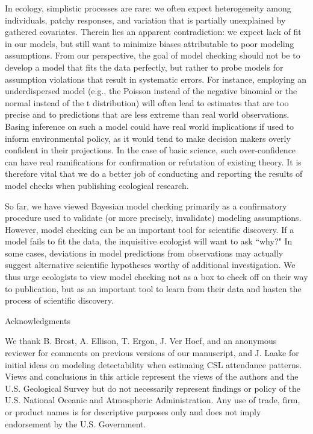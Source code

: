 \documentclass[12pt,english]{article}
\begin{document}
\begin{spacing}{1.9}
In ecology, simplistic processes are rare: we often expect
heterogeneity among individuals, patchy responses, and variation that
is partially unexplained by gathered covariates.  Therein lies an
apparent contradiction: we expect lack of fit in our models, but still
want to minimize biases attributable to poor modeling assumptions.
From our perspective, the goal of model checking should not be to
develop a model that fits the data perfectly, but rather to probe
models for assumption violations that result in systematic errors.  For instance,
employing an underdispersed model (e.g., the Poisson instead of the negative
binomial or the normal instead of the t distribution) will often lead to estimates that
are too precise and to predictions that are less extreme than real world observations.
Basing inference on such a model could have real world implications if used
to inform environmental policy, as it would tend to make decision makers overly confident
in their projections.  In the case of basic science, such over-confidence can have
real ramifications for confirmation or refutation of existing theory. It is therefore vital that we do a better job
of conducting and reporting the results of model checks when
publishing ecological research.

So far, we have viewed Bayesian model checking primarily as a confirmatory procedure used to
validate (or more precisely, invalidate) modeling assumptions.  However, model checking
can be an important tool for scientific discovery.  If a model fails to fit the data, the inquisitive
ecologist will want to ask ``why?"  In some cases, deviations in model predictions from
observations may actually suggest alternative scientific
hypotheses worthy of additional investigation.  We thus urge ecologists to view model checking not as a box
to check off on their way to publication, but as an important tool to learn from their data
and hasten the process of scientific discovery.

\centerline{\sc Acknowledgments} We thank B. Brost,
A. Ellison, T. Ergon, J. Ver Hoef, and an anonymous reviewer for comments on
previous versions of our manuscript, and J. Laake for initial ideas
on modeling detectability when estimaing CSL attendance patterns.
Views and conclusions in this article represent the views of the
authors and the U.S. Geological Survey but do not necessarily
represent findings or policy of the U.S. National Oceanic and
Atmospheric Administration.  Any use of trade, firm, or product names
is for descriptive purposes only and does not imply endorsement by the
U.S. Government.


\end{spacing}
\end{document}

